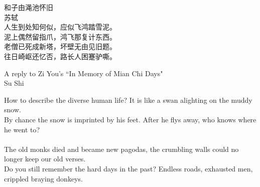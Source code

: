 \begin{preface}
\begin{center}
 和子由渑池怀旧\\
    \vspace{2mm}\hspace{40mm}苏轼\\
 \vspace{2mm}人生到处知何似，应似飞鸿踏雪泥。\\
 \vspace{2mm}泥上偶然留指爪，鸿飞那复计东西。\\
 \vspace{4mm}老僧已死成新塔，坏壁无由见旧题。\\
 \vspace{2mm}往日崎岖还忆否，路长人困蹇驴嘶。
\end{center}
    \vspace{5mm}
\begin{center}
    A reply to Zi You's ``In Memory of Mian Chi Days"\\
    \vspace{2mm}\hspace{40mm} Su Shi\\
\end{center}
     How to describe the diverse human life? It is like a swan alighting on the muddy snow.\\
     By chance the snow is imprinted by his feet. After he flys away, who knows where he went to?\\ 
\vspace{2mm}\\
     The old monks died and became new pagodas, the crumbling walls could no longer keep our old verses.\\
     Do you still remember the hard days in the past? Endless roads, exhausted men, crippled braying donkeys.
\end{preface}
